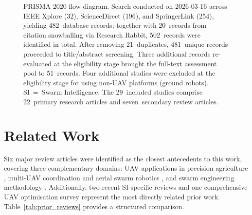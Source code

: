 \documentclass[review,3p]{elsarticle}
\begin{document}
\begin{figure}[htbp]
\caption{PRISMA 2020 flow diagram. Search conducted on 2026-03-16 across IEEE
Xplore (32), ScienceDirect (196), and SpringerLink (254), yielding 482~database
records; together with 20~records from citation snowballing via Research Rabbit,
502~records were identified in total. After removing 21~duplicates, 481~unique
records proceeded to title/abstract screening. Three additional records
re-evaluated at the eligibility stage brought the full-text assessment pool to
51~records. Four additional studies were excluded at the eligibility stage for
using non-UAV platforms (ground robots). SI~=~Swarm Intelligence. The
29~included studies comprise 22~primary research articles and
seven~secondary review articles.}
\label{fig:prisma}
\end{figure}

\section{Related Work}

Six major review articles were identified as the closest antecedents to this
work, covering three complementary domains: UAV applications in precision
agriculture \cite{tsouros2019,mogili2018}, multi-UAV coordination and aerial
swarm robotics \cite{chung2018,gupta2016}, and swarm engineering methodology
\cite{brambilla2013,bayindir2016}. Additionally, two recent SI-specific reviews
\cite{puente2022,sharma2022} and one comprehensive UAV optimisation survey
\cite{aitsaadi2022} represent the most directly related prior work.
Table~\ref{tab:prior_reviews} provides a structured comparison.
\end{document}
